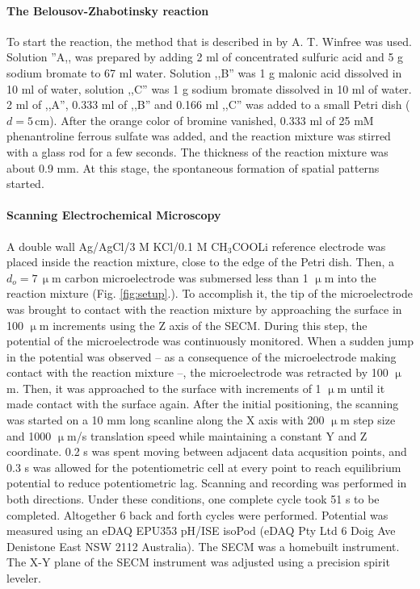 \documentclass[3p, twocolumn]{elsarticle}
\begin{document}
\paragraph{The Belousov-Zhabotinsky reaction} 
To start the reaction, the method that is described in \cite{winfree} by A. T. Winfree was used.
Solution ''A,, was prepared by adding 2 ml of concentrated sulfuric acid and 5 g sodium bromate to 67 ml water.
Solution ,,B'' was 1 g malonic acid dissolved in 10 ml of water, solution ,,C'' was 1 g sodium bromate dissolved in 10 ml of water.
2 ml of ,,A'', 0.333 ml of ,,B'' and 0.166 ml ,,C'' was added to a small Petri dish ($d = 5 \,$cm).
After the orange color of bromine vanished, 0.333 ml of 25 mM phenantroline ferrous sulfate was added, and the reaction mixture was stirred with a glass rod for a few seconds.
The thickness of the reaction mixture was about 0.9 mm.
At this stage, the spontaneous formation of spatial patterns started.

\paragraph{Scanning Electrochemical Microscopy} A double wall Ag/AgCl/3 M KCl/0.1 M CH$_3$COOLi reference electrode was placed inside the reaction mixture, close to the edge of the Petri dish.
Then, a $d_o = 7\, \upmu$m carbon microelectrode was submersed less than 1 $\upmu$m into the reaction mixture (Fig. \ref{fig:setup}.).
To accomplish it, the tip of the microelectrode was brought to contact with the reaction mixture by approaching the surface in 100 $\upmu$m increments using the Z axis of the SECM.
During this step, the potential of the microelectrode was continuously monitored.
When a sudden jump in the potential was observed -- as a consequence of the microelectrode making contact with the reaction mixture --, the microelectrode was retracted by 100 $\upmu$m.
Then, it was approached to the surface with increments of 1 $\upmu$m until it made contact with the surface again.
After the initial positioning, the scanning was started on a 10 mm long scanline along the X axis with 200 $\upmu$m step size and 1000 $\upmu$m/s translation speed while maintaining a constant Y and Z coordinate.
0.2 s was spent moving between adjacent data acqusition points, and 0.3 s was allowed for the potentiometric cell at every point to reach equilibrium potential to reduce potentiometric lag.
Scanning and recording was performed in both directions.
Under these conditions, one complete cycle took 51 s to be completed.
Altogether 6 back and forth cycles were performed.
Potential was measured using an eDAQ EPU353 pH/ISE isoPod (eDAQ Pty Ltd 6 Doig Ave Denistone East NSW 2112 Australia).
The SECM was a homebuilt instrument.
The X-Y plane of the SECM instrument was adjusted using a precision spirit leveler.
\end{document}
